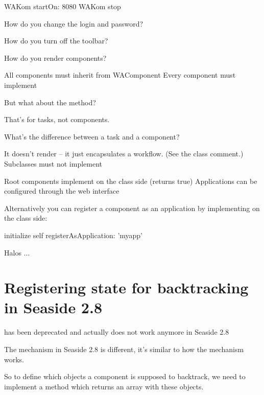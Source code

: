 \documentclass[a4paper,10pt,twoside]{book}
\begin{document}
\begin{code}
WAKom startOn: 8080
WAKom stop
\end{code}

\begin{faq}
How do you change the login and password?
\end{faq}
\answer

\begin{faq}
How do you turn off the toolbar?
\end{faq}
\answer

\begin{faq}
How do you render components?
\end{faq}
\answer
All components must inherit from WAComponent
Every component must implement 

\begin{faq}
But what about the  method?
\end{faq}
\answer
That's for tasks, not components.

\begin{faq}
What's the difference between a task and a component?
\end{faq}
\answer
It doesn't render -- it just encapsulates a workflow.
(See the class comment.)
Subclasses must not implement 

Root components implement  on the class side (returns true)
Applications can be configured through the web interface

Alternatively you can register a component as an application by implementing  on the class side:
\begin{code}
initialize
	self registerAsApplication: 'myapp'
\end{code}

Halos ...

\section{Registering state for backtracking in Seaside 2.8}

 has been deprecated and actually does not work
anymore in Seaside 2.8


The mechanism in Seaside 2.8 is different, it's similar to how the  mechanism works.

So to define which objects a component is supposed to backtrack, we need to implement a method  which returns an array with these objects.
\end{document}
